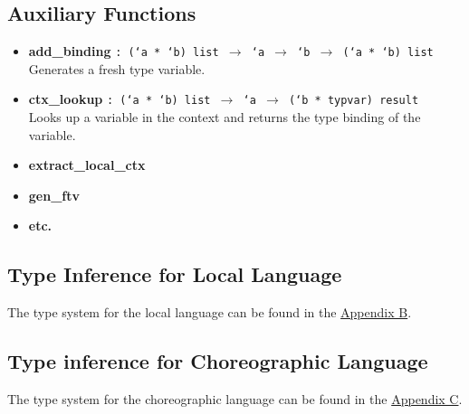 \documentclass{article}
\begin{document}
\subsection{Auxiliary Functions}
    \begin{itemize}
        \item \textbf{add\_binding} \texttt{: (`a * `b) list $\to$ `a $\to$ `b $\to$ (`a * `b) list} \\
              Generates a fresh type variable.
        \item \textbf{ctx\_lookup} \texttt{: (`a * `b) list $\to$ `a $\to$ (`b * typvar) result} \\
              Looks up a variable in the context and returns the type binding of the variable.
        \item \textbf{extract\_local\_ctx}
        \item \textbf{gen\_ftv}
        \item \textbf{etc.}
    \end{itemize}

\subsection{Type Inference for Local Language}
    The type system for the local language can be found in the \hyperref[appendix:local_typ]{Appendix B}.

\subsection{Type inference for Choreographic Language}
    The type system for the choreographic language can be found in the \hyperref[appendix:choreo_typ]{Appendix C}.

    \newpage %
\end{document}
